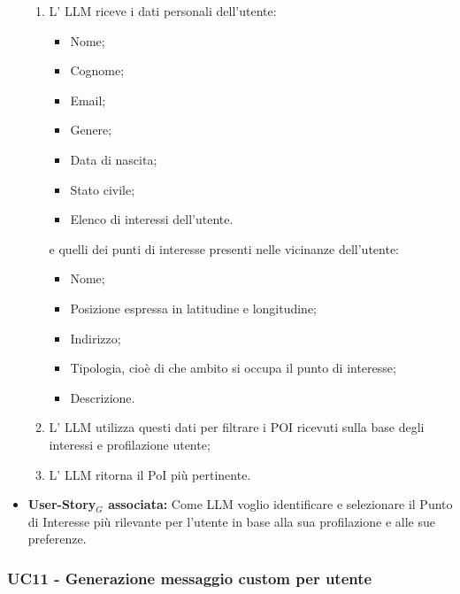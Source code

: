 \documentclass[11pt]{article}
\begin{document}
\begin{justify}
\begin{itemize}
        \begin{enumerate}
        \item L' LLM riceve i dati personali dell'utente:
          \begin{itemize}
          \item Nome;
          \item Cognome;
          \item Email;
          \item Genere;
          \item Data di nascita;
          \item Stato civile;
          \item Elenco di interessi dell'utente.
          \end{itemize}
          e quelli dei punti di interesse presenti nelle vicinanze dell'utente:
          \begin{itemize}
          \item Nome;
          \item Posizione espressa in latitudine e longitudine;
          \item Indirizzo;
          \item Tipologia, cioè di che ambito si occupa il punto di interesse;
          \item Descrizione.
          \end{itemize}
        \item L' LLM utilizza questi dati per filtrare i POI ricevuti sulla base degli interessi e profilazione utente;
        \item L' LLM ritorna il PoI più pertinente. 
        \end{enumerate}
    \item \textbf{User-Story$_G$ associata:} Come LLM voglio identificare e selezionare il Punto di Interesse più rilevante per l'utente in base alla sua profilazione e alle sue preferenze.
\end{itemize}


\subsubsection{\textbf{UC11 - Generazione messaggio custom per utente}}


\end{justify}
\end{document}
